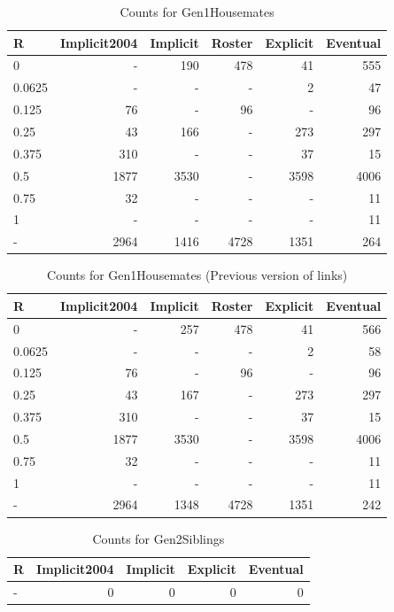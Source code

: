 \documentclass[a4paper]{article}\usepackage[]{graphicx}\usepackage[]{color}
\begin{document}
\begin{table}[ht]
\centering
{\large
\begin{tabular}{lrrrrr}
  \hline
R & Implicit2004 & Implicit & Roster & Explicit & Eventual \\ 
  \hline
0 & - & 190 & 478 &  41 & 555 \\ 
  0.0625 & - & - & - &   2 &  47 \\ 
  0.125 &  76 & - &  96 & - &  96 \\ 
  0.25 &  43 & 166 & - & 273 & 297 \\ 
  0.375 & 310 & - & - &  37 &  15 \\ 
  0.5 & 1877 & 3530 & - & 3598 & 4006 \\ 
  0.75 &  32 & - & - & - &  11 \\ 
  1 & - & - & - & - &  11 \\ 
  - & 2964 & 1416 & 4728 & 1351 & 264 \\ 
   \hline
\end{tabular}
}
\caption{Counts for Gen1Housemates} 
\end{table}
\begin{table}[ht]
\centering
{\large
\begin{tabular}{lrrrrr}
  \hline
R & Implicit2004 & Implicit & Roster & Explicit & Eventual \\ 
  \hline
0 & - & 257 & 478 &  41 & 566 \\ 
  0.0625 & - & - & - &   2 &  58 \\ 
  0.125 &  76 & - &  96 & - &  96 \\ 
  0.25 &  43 & 167 & - & 273 & 297 \\ 
  0.375 & 310 & - & - &  37 &  15 \\ 
  0.5 & 1877 & 3530 & - & 3598 & 4006 \\ 
  0.75 &  32 & - & - & - &  11 \\ 
  1 & - & - & - & - &  11 \\ 
  - & 2964 & 1348 & 4728 & 1351 & 242 \\ 
   \hline
\end{tabular}
}
\caption{Counts for Gen1Housemates (Previous version of links)} 
\end{table}
\begin{table}[ht]
\centering
{\large
\begin{tabular}{lrrrr}
  \hline
R & Implicit2004 & Implicit & Explicit & Eventual \\ 
  \hline
- &   0 &   0 &   0 &   0 \\ 
   \hline
\end{tabular}
}
\caption{Counts for Gen2Siblings} 
\end{table}
\end{document}
